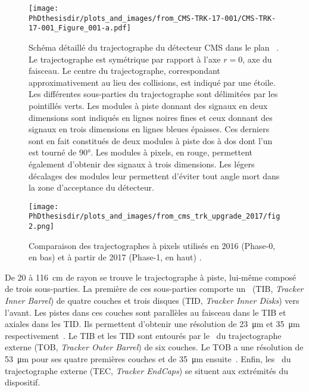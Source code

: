 \begin{figure}[h]
\centering
\texttt{[image: \\PhDthesisdir/plots\_and\_images/from\_CMS-TRK-17-001/CMS-TRK-17-001\_Figure\_001-a.pdf]}
\caption[Schéma détaillé du trajectographe du détecteur CMS.]{Schéma détaillé du trajectographe du détecteur CMS dans le plan ~\cite{CMS-TRK-11-001,CMS-TRK-17-001}. Le trajectographe est symétrique par rapport à l'axe $r=0$, axe du faisceau. Le centre du trajectographe, correspondant approximativement au lieu des collisions, est indiqué par une étoile. Les différentes sous-parties du trajectographe sont délimitées par les pointillés verts. Les modules à piste donnant des signaux en deux dimensions sont indiqués en lignes noires fines et ceux donnant des signaux en trois dimensions en lignes bleues épaisses. Ces derniers sont en fait constitués de deux modules à piste dos à dos dont l'un est tourné de \ang{90}. Les modules à pixels, en rouge, permettent également d'obtenir des signaux à trois dimensions. Les légers décalages des modules leur permettent d'éviter tout angle mort dans la zone d'acceptance du détecteur.}
\label{fig-CMS-trk_detailed_scheme}
\end{figure}
\begin{figure}[h]
\centering
\texttt{[image: \\PhDthesisdir/plots\_and\_images/from\_cms\_trk\_upgrade\_2017/fig2.png]}
\caption[Comparaison des trajectographes à pixels utilisés en 2016 et à partir de 2017.]{Comparaison des trajectographes à pixels utilisés en 2016 (Phase-0, en bas) et à partir de 2017 (Phase-1, en haut) \cite{CMS-TDR-11,cms_trk_upgrade_2017}.}
\label{fig-chapter-LHC-section-CMS-subsec-tracker-2017-upgrade}
\end{figure}
\par De \num{20} à \SI{116}{\centi\meter} de rayon se trouve le trajectographe à piste, lui-même composé de trois sous-parties.
La première de ces sous-parties comporte un \CMSbarrel\ (TIB, \emph{Tracker Inner Barrel}) de quatre couches et trois disques (TID, \emph{Tracker Inner Disks}) vers l'avant.
Les pistes dans ces couches sont parallèles au faisceau dans le TIB et axiales dans les TID.
Ils permettent d'obtenir une résolution de \SI{23}{\micro\meter} et \SI{35}{\micro\meter} respectivement~\cite{cms_paper}.
Le TIB et les TID sont entourés par le \CMSbarrel\ du trajectographe externe (TOB, \emph{Tracker Outer Barrel}) de six couches.
Le TOB a une résolution de \SI{53}{\micro\meter} pour ses quatre premières couches et de \SI{35}{\micro\meter} ensuite~\cite{cms_paper}.
Enfin, les \CMSendcaps\ du trajectographe externe (TEC, \emph{Tracker EndCaps}) se situent aux extrémités du dispositif.
